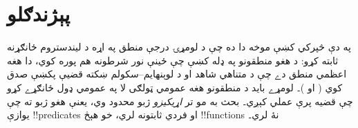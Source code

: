 \documentclass[../../../include/open-logic-section]{subfiles}
\begin{document}
\section{پېژندګلو}

په دې څپرکي کښې موخه دا ده چې د لومړۍ درجې منطق په اړه د ليندستروم
ځانګړنه ثابته کړو: د هغو منطقونو په ډله کښې چې ځينې نور شرطونه هم
پوره کوي، دا هغه اعظمي منطق دے چې د متناهي شاهد او د لوېنهايم--سکولم
ښکته قضیې پکښې صدق کوي
( او
)۔ لومړے بايد د منطقونو هغه عمومي
ټولګی لا په عمومي ډول ځانګړے کړو چې قضيه پرې عملي کېږي۔ بحث به مو
تر \emph{اړيکيزو} ژبو محدود وي، يعنې هغو ژبو ته چې يوازې
!!{predicate}s او فردي ثابتونه لري، خو هېڅ !!{function}s نۀ لري۔
\end{document}
